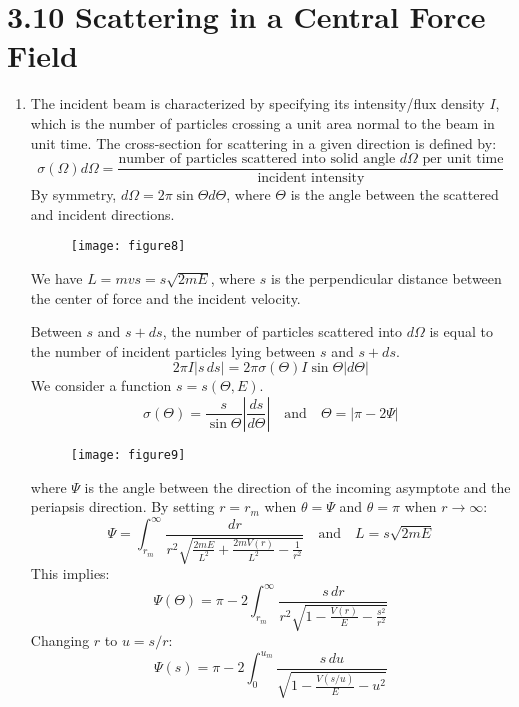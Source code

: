 \documentclass{article}
\begin{document}
	\section*{3.10 Scattering in a Central Force Field}
	\begin{enumerate}
		\item The incident beam is characterized by specifying its intensity/flux density $I$, which is the number of particles crossing a unit area normal to the beam in unit time. The cross-section for scattering in a given direction is defined by:
		\[
		\sigma(\Omega)d\Omega = \frac{\text{number of particles scattered into solid angle } d\Omega \text{ per unit time}}{\text{incident intensity}}
		\]
		By symmetry, $d\Omega = 2\pi\sin\Theta d\Theta$, where $\Theta$ is the angle between the scattered and incident directions. 
		
		\begin{figure}[h]
			\centering
			\texttt{[image: figure8]}
			\caption{}
			\label{fig:figure8}
		\end{figure}
		
		We have $L=mvs = s\sqrt{2mE}$, where $s$ is the perpendicular distance between the center of force and the incident velocity.
		
		Between $s$ and $s+ds$, the number of particles scattered into $d\Omega$ is equal to the number of incident particles lying between $s$ and $s+ds$.
		\[
		2\pi I |s\,ds| = 2\pi \sigma(\Theta) I \sin\Theta |d\Theta|
		\]
		We consider a function $s=s(\Theta, E)$. 
		\[
		\sigma(\Theta) = \frac{s}{\sin\Theta}\left|\frac{ds}{d\Theta}\right| \quad \text{and} \quad \Theta = |\pi-2\Psi|
		\]
		
		\begin{figure}[h]
			\centering
			\texttt{[image: figure9]}
			\caption{}
			\label{fig:figure9}
		\end{figure}
		
		where $\Psi$ is the angle between the direction of the incoming asymptote and the periapsis direction. By setting $r=r_m$ when $\theta=\Psi$ and $\theta=\pi$ when $r \to \infty$:
		\[
		\Psi = \int_{r_m}^{\infty} \frac{dr}{r^2\sqrt{\frac{2mE}{L^2} + \frac{2mV(r)}{L^2} - \frac{1}{r^2}}} \quad \text{and} \quad L=s\sqrt{2mE}
		\]
		This implies:
		\[
		\Psi(\Theta) = \pi - 2\int_{r_m}^{\infty} \frac{s \, dr}{r^2 \sqrt{1 - \frac{V(r)}{E} - \frac{s^2}{r^2}}}
		\]
		Changing $r$ to $u=s/r$:
		\[
		\Psi(s) = \pi - 2\int_0^{u_m} \frac{s \, du}{\sqrt{1 - \frac{V(s/u)}{E} - u^2}}
		\]
		

\end{enumerate}
\end{document}
